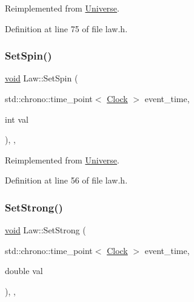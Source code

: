 Reimplemented from \mbox{\hyperlink{class_universe_ae0cb8d86b2fbb8396d605160344b42f5}{Universe}}.



Definition at line 75 of file law.\+h.

\mbox{\label{class_law_a3de75edea5e20db0a7b731de61f07dea}} 
\subsubsection{\texorpdfstring{Set\+Spin()}{SetSpin()}}
{\footnotesize\ttfamily \mbox{\hyperlink{glad_8h_a950fc91edb4504f62f1c577bf4727c29}{void}} Law\+::\+Set\+Spin (\begin{DoxyParamCaption}\item[{std\+::chrono\+::time\+\_\+point$<$ \mbox{\hyperlink{universe_8h_a0ef8d951d1ca5ab3cfaf7ab4c7a6fd80}{Clock}} $>$}]{event\+\_\+time,  }\item[{int}]{val }\end{DoxyParamCaption})\hspace{0.3cm}{\ttfamily [inline]}, {\ttfamily [final]}, {\ttfamily [virtual]}}



Reimplemented from \mbox{\hyperlink{class_universe_ae2ae1c3b3e4cde2c18f5f6a814761ec8}{Universe}}.



Definition at line 56 of file law.\+h.

\mbox{\label{class_law_a4cd0dd1908edbd02090dd1ba1387d722}} 
\subsubsection{\texorpdfstring{Set\+Strong()}{SetStrong()}}
{\footnotesize\ttfamily \mbox{\hyperlink{glad_8h_a950fc91edb4504f62f1c577bf4727c29}{void}} Law\+::\+Set\+Strong (\begin{DoxyParamCaption}\item[{std\+::chrono\+::time\+\_\+point$<$ \mbox{\hyperlink{universe_8h_a0ef8d951d1ca5ab3cfaf7ab4c7a6fd80}{Clock}} $>$}]{event\+\_\+time,  }\item[{double}]{val }\end{DoxyParamCaption})\hspace{0.3cm}{\ttfamily [inline]}, {\ttfamily [final]}, {\ttfamily [virtual]}}




